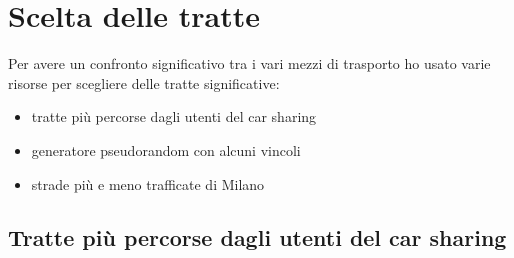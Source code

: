 \documentclass[a4paper]{report}
\begin{document}
		\section{Scelta delle tratte}
		{\large
			Per avere un confronto significativo tra i vari mezzi di trasporto ho usato varie risorse per scegliere delle tratte significative:
			\begin{itemize}
				\item tratte più percorse dagli utenti del car sharing
				\item generatore pseudorandom con alcuni vincoli
				\item strade più e meno trafficate di Milano
			\end{itemize}
		}

		\subsection{Tratte più percorse dagli utenti del car sharing}

	
	
\end{document}
